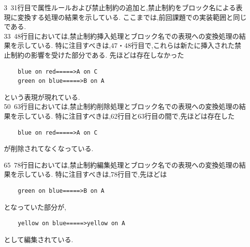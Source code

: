 \documentclass[12pt]{jarticle}
\begin{document}
3~31行目で属性ルールおよび禁止制約の追加と,禁止制約をブロック名による表現に変換する処理の結果を示している.
ここまでは,前回課題での実装範囲と同じである. \\

33~48行目においては,禁止制約挿入処理とブロック名での表現への変換処理の結果を示している.
特に注目すべきは,47・48行目で,これらは新たに挿入された禁止制約の影響を受けた部分である.
先ほどは存在しなかった
\begin{verbatim}
    blue on red=====>A on C
    green on blue=====>B on A
\end{verbatim}
という表現が現れている. \\

50~63行目においては,禁止制約削除処理とブロック名での表現への変換処理の結果を示している.
特に注目すべきは,62行目と63行目の間で,先ほどは存在した
\begin{verbatim}
    blue on red=====>A on C
\end{verbatim}
が削除されてなくなっている.

65~78行目においては,禁止制約編集処理とブロック名での表現への変換処理の結果を示している.
特に注目すべきは,78行目で,先ほどは
\begin{verbatim}
    green on blue=====>B on A
\end{verbatim}
となっていた部分が,
\begin{verbatim}
    yellow on blue=====>yellow on A
\end{verbatim}
として編集されている.
\end{document}
